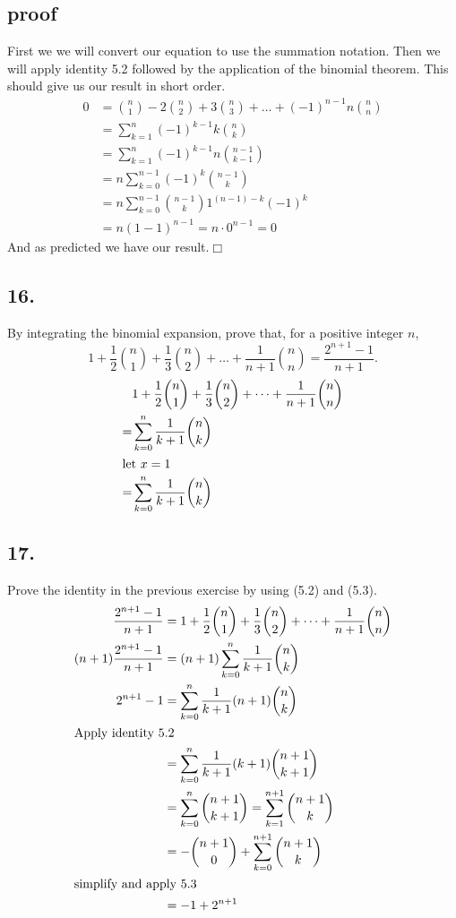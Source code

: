 \documentclass{article}
\begin{document}
\subsection*{proof}
First we we will convert our equation to use the summation notation. Then we will apply identity 5.2 followed by the application of the binomial theorem. This should give us our result in short order.
\begin{align*}
  0&=\binom{n}{1}-2\binom{n}{2}+3\binom{n}{3}+\dots+(-1)^{n-1}n\binom{n}{n}\\
  &=\sum\limits_{k=1}^n{(-1)^{k-1}k\binom{n}{k}}\\
  &=\sum\limits_{k=1}^n{(-1)^{k-1}n\binom{n-1}{k-1}}\\
  &=n\sum\limits_{k=0}^{n-1}{(-1)^{k}\binom{n-1}{k}}\\
  &=n\sum\limits_{k=0}^{n-1}{\binom{n-1}{k}1^{(n-1)-k}(-1)^{k}}\\
  &=n(1-1)^{n-1}=n\cdot0^{n-1}=0
\end{align*}
And as predicted we have our result.$\Box$
\subsection*{16.}
By integrating the binomial expansion, prove that, for a positive integer $n$,
\[1+\frac{1}{2}\binom{n}{1}+\frac{1}{3}\binom{n}{2}+\dots+\frac{1}{n+1}\binom{n}{n}=\frac{2^{n+1}-1}{n+1}.\]
\begin{align*}
  &1+\frac{1}{2}\binom{n}{1}+\frac{1}{3}\binom{n}{2}+\dots+\frac{1}{n+1}\binom{n}{n}\\
  =&\sum\limits_{k=0}^n{\frac{1}{k+1}\binom{n}{k}}\\
  \intertext{let $x=1$}
  =&\sum\limits_{k=0}^n{\frac{1}{k+1}\binom{n}{k}}\\
\end{align*}
\subsection*{17.}
Prove the identity in the previous exercise by  using (5.2) and (5.3).
\begin{align*}
  \frac{2^{n+1}-1}{n+1}&=1+\frac{1}{2}\binom{n}{1}+\frac{1}{3}\binom{n}{2}+\dots+\frac{1}{n+1}\binom{n}{n}\\
  (n+1)\frac{2^{n+1}-1}{n+1}&=(n+1)\sum\limits_{k=0}^n{\frac{1}{k+1}\binom{n}{k}}\\
  2^{n+1}-1&=\sum\limits_{k=0}^n{\frac{1}{k+1}(n+1)\binom{n}{k}}\\
  \intertext{Apply identity 5.2}
  &=\sum\limits_{k=0}^n{\frac{1}{k+1}(k+1)\binom{n+1}{k+1}}\\
  &=\sum\limits_{k=0}^n{\binom{n+1}{k+1}}=\sum\limits_{k=1}^{n+1}{\binom{n+1}{k}}\\
  &=-\binom{n+1}{0}+\sum\limits_{k=0}^{n+1}{\binom{n+1}{k}}\\
  \intertext{simplify and apply 5.3}
  &=-1+2^{n+1}
\end{align*}
\end{document}
